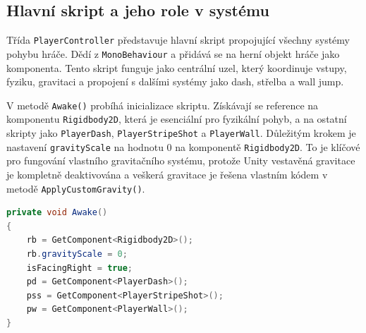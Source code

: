 \subsection{Hlavní skript a jeho role v systému}

Třída \texttt{PlayerController} představuje hlavní skript propojující všechny systémy pohybu hráče. Dědí z \texttt{MonoBehaviour} a přidává se na herní objekt hráče jako komponenta. Tento skript funguje jako centrální uzel, který koordinuje vstupy, fyziku, gravitaci a propojení s dalšími systémy jako dash, střelba a wall jump.

V metodě \texttt{Awake()} probíhá inicializace skriptu. Získávají se reference na komponentu \texttt{Rigidbody2D}, která je esenciální pro fyzikální pohyb, a na ostatní skripty jako \texttt{PlayerDash}, \texttt{PlayerStripeShot} a \texttt{PlayerWall}. Důležitým krokem je nastavení \texttt{gravityScale} na hodnotu 0 na komponentě \texttt{Rigidbody2D}. To je klíčové pro fungování vlastního gravitačního systému, protože Unity vestavěná gravitace je kompletně deaktivována a veškerá gravitace je řešena vlastním kódem v metodě \texttt{ApplyCustomGravity()}.

\begin{lstlisting}[language=csharp,caption={Listing 2: Awake metoda}]
private void Awake()
{
    rb = GetComponent<Rigidbody2D>();
    rb.gravityScale = 0;
    isFacingRight = true;
    pd = GetComponent<PlayerDash>();
    pss = GetComponent<PlayerStripeShot>();
    pw = GetComponent<PlayerWall>();
}
\end{lstlisting}
